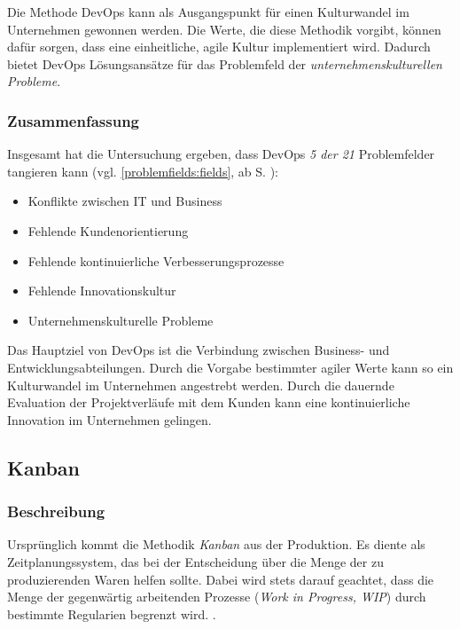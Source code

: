 Die Methode DevOps kann als Ausgangspunkt für einen Kulturwandel im Unternehmen gewonnen werden. Die Werte, die diese Methodik vorgibt, können dafür sorgen, dass eine einheitliche, agile Kultur implementiert wird. Dadurch bietet DevOps Lösungsansätze für das Problemfeld der \textit{unternehmenskulturellen Probleme}.

\subsubsection{Zusammenfassung}

Insgesamt hat die Untersuchung ergeben, dass DevOps \textit{5 der 21} Problemfelder tangieren kann (vgl. \ref{problemfields:fields}, ab S. \pageref{problemfields:fields}):

\begin{itemize}[noitemsep, topsep=0pt]
	\item Konflikte zwischen IT und Business
	\item Fehlende Kundenorientierung
	\item Fehlende kontinuierliche Verbesserungsprozesse
	\item Fehlende Innovationskultur
	\item Unternehmenskulturelle Probleme
\end{itemize}

Das Hauptziel von DevOps ist die Verbindung zwischen Business- und Entwicklungsabteilungen. Durch die Vorgabe bestimmter agiler Werte kann so ein Kulturwandel im Unternehmen angestrebt werden. Durch die dauernde Evaluation der Projektverläufe mit dem Kunden kann eine kontinuierliche Innovation im Unternehmen gelingen.

\subsection{Kanban}

\subsubsection{Beschreibung}

Ursprünglich kommt die Methodik \textit{Kanban} aus der Produktion.  Es diente als Zeitplanungssystem, das bei der Entscheidung über die Menge der zu produzierenden Waren helfen sollte. Dabei wird stets darauf geachtet, dass die Menge der gegenwärtig arbeitenden Prozesse (\textit{Work in Progress, WIP}) durch bestimmte Regularien begrenzt wird. \cite[S. 12f.]{leopold_kanban_2018}.

